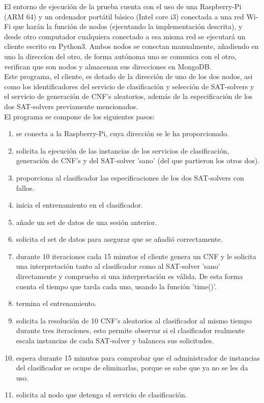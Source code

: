 \documentclass[11pt]{article}
\begin{document}
		El entorno de ejecución de la prueba cuenta con el uso de una Raspberry-Pi (ARM 64) y un ordenador portátil básico (Intel core i3) conectada a una red Wi-Fi que harán 
		la función de nodos (ejecutando la implementación descrita), y
		desde otro computador cualquiera conectado a esa misma red se ejecutará un cliente escrito en Python3. 
		Ambos nodos se conectan manualmente, añadiendo en uno la direccíon del otro, de forma autónoma uno se comunica con el otro, verifican que son nodos y almacenan sus direcciones en MongoDB. \\
		Este programa, el cliente, es dotado de la dirección de uno de los dos nodos,
		asi como los identificadores del servicio de clasificación y selección de SAT-solvers y el servicio de generación de CNF's aleatorios, además de la especificación de los dos SAT-solvers
		previamente mencionados. \\ El programa se compone de los siguientes pasos:
		\begin{enumerate}
			\item se conecta a la Raspberry-Pi, cuya dirección se le ha proporcionado.
			\item solicita la ejecución de las instancias de los servicios de clasificación, generación de CNF's y del SAT-solver 'sano' (del que partieron los otros dos).
			\item proporciona al clasificador las especificaciones de los dos SAT-solvers con fallos.
			\item inicia el entrenamiento en el clasificador.
			\item añade un set de datos de una sesión anterior.
			\item solicita el set de datos para asegurar que se añadió correctamente.
			\item durante 10 iteraciones cada 15 minutos el cliente genera un CNF y le solicita una interpretación tanto 
				al clasificador como al SAT-solver 'sano' directamente y comprueba si una interpretación es válida. De esta forma cuenta el tiempo que tarda cada uno, usando la función 'time()'.
			\item termina el entrenamiento.
			\item solicita la resolución de 10 CNF's aleatorios al clasificador al mismo tiempo durante tres iteraciones, esto permite observar si el clasificador realmente escala instancias de cada
				SAT-solver y balancea sus solicitudes.
			\item espera durante 15 minutos para comprobar que el administrador de instancias del clasificador se ocupe de eliminarlas, porque se sabe que ya no se les da uso.
			\item solicita al nodo que detenga el servicio de clasificación.
		\end{enumerate}
\end{document}
